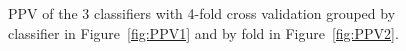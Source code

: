 \documentclass[a4paper,11pt]{article}
\begin{document}



\begin{figure}[!h]
	\centering
	\caption{PPV of the 3 classifiers with 4-fold cross validation grouped by classifier in Figure~\ref{fig:PPV1} and by fold in Figure~\ref{fig:PPV2}.}
	\label{fig:RealPPV}
\end{figure}
\end{document}
